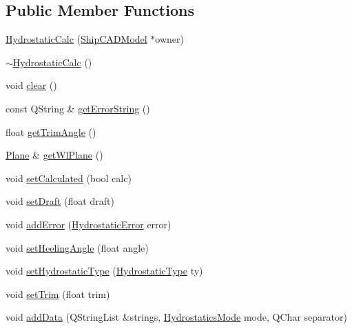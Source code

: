 \subsection*{Public Member Functions}
\begin{DoxyCompactItemize}
\item 
\hyperlink{classShipCAD_1_1HydrostaticCalc_ae0ae227c3c8d4703a37a2a05555733e5}{Hydrostatic\-Calc} (\hyperlink{classShipCAD_1_1ShipCADModel}{Ship\-C\-A\-D\-Model} $\ast$owner)
\item 
\hyperlink{classShipCAD_1_1HydrostaticCalc_a1b44080312f590fecf67819a2f2ffb1b}{$\sim$\-Hydrostatic\-Calc} ()
\item 
void \hyperlink{classShipCAD_1_1HydrostaticCalc_a5245d91025105e4bb0a9c2888a5335ec}{clear} ()
\item 
const Q\-String \& \hyperlink{classShipCAD_1_1HydrostaticCalc_ad4f7ea3b7be113060b2e0a080e02cb8f}{get\-Error\-String} ()
\item 
float \hyperlink{classShipCAD_1_1HydrostaticCalc_a4c6f19ead79b5768676b2a8ae6de5a61}{get\-Trim\-Angle} ()
\item 
\hyperlink{classShipCAD_1_1Plane}{Plane} \& \hyperlink{classShipCAD_1_1HydrostaticCalc_a29852abc1e3d6049543cd80449810ffc}{get\-Wl\-Plane} ()
\item 
void \hyperlink{classShipCAD_1_1HydrostaticCalc_a20dce4cc4ee1e7f2c86142a8bff074da}{set\-Calculated} (bool calc)
\item 
void \hyperlink{classShipCAD_1_1HydrostaticCalc_a0302cb442ba844cc18acef125a706ecf}{set\-Draft} (float draft)
\item 
void \hyperlink{classShipCAD_1_1HydrostaticCalc_a7c42f2e85cca01401ece2684903b7fbd}{add\-Error} (\hyperlink{namespaceShipCAD_a48b5202490cd6d86939d57c867837c0f}{Hydrostatic\-Error} error)
\item 
void \hyperlink{classShipCAD_1_1HydrostaticCalc_ab7e95fb64604515d6e461943787a6bd9}{set\-Heeling\-Angle} (float angle)
\item 
void \hyperlink{classShipCAD_1_1HydrostaticCalc_a6ac3be35f608cfbbb2d00c62a210a6ea}{set\-Hydrostatic\-Type} (\hyperlink{namespaceShipCAD_af34462de5db0247c80b656785e989233}{Hydrostatic\-Type} ty)
\item 
void \hyperlink{classShipCAD_1_1HydrostaticCalc_a411eccef26214d6788ef038c21609f2c}{set\-Trim} (float trim)
\item 
void \hyperlink{classShipCAD_1_1HydrostaticCalc_afc31ddaf0eaea47ce63a2400f98aa9c6}{add\-Data} (Q\-String\-List \&strings, \hyperlink{namespaceShipCAD_a1d3d04d35d63e8a5e44c63183f79200a}{Hydrostatics\-Mode} mode, Q\-Char separator)

\end{DoxyCompactItemize}
